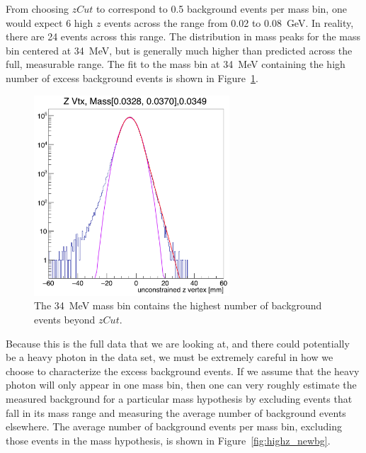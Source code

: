 From choosing $zCut$ to correspond to 0.5 background events per mass bin, one would expect 6 high $z$ events across the range from 0.02 to 0.08~GeV. In reality, there are 24 events across this range. The distribution in mass peaks for the mass bin centered at 34~MeV, but is generally much higher than predicted across the full, measurable range. The fit to the mass bin at 34~MeV containing the high number of excess background events is shown in Figure~\ref{fig:highz_34mev}.\\
\begin{figure}[htb]
  \centering
      \includegraphics[width=0.65\textwidth]{pics/results/zvtx_34MeV.png}
  \caption[Vertex distribution for 34~MeV mass bin with high $z$ background]{The 34~MeV mass bin contains the highest number of background events beyond $zCut$.}
  \label{fig:highz_34mev}
\end{figure} 
\indent Because this is the full data that we are looking at, and there could potentially be a heavy photon in the data set, we must be extremely careful in how we choose to characterize the excess background events. If we assume that the heavy photon will only appear in one mass bin, then one can very roughly estimate the measured background for a particular mass hypothesis by excluding events that fall in its mass range and measuring the average number of background events elsewhere. The average number of background events per mass bin, excluding those events in the mass hypothesis, is shown in Figure~\ref{fig:highz_newbg}.
 
